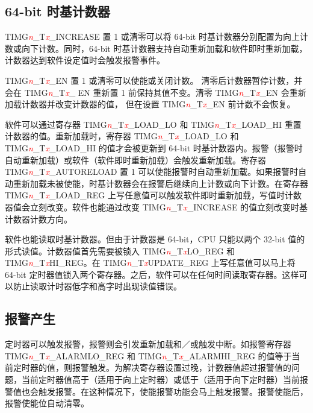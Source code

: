 \documentclass[main\_\_CN.tex]{subfiles}
\begin{document}
\subsection{64-bit 时基计数器}
TIMG\textcolor{red}{\it{n}}\_T\textcolor{red}{\it{x}}\_INCREASE 置 1 或清零可以将 64-bit 时基计数器分别配置为向上计数或向下计数。同时，64-bit 时基计数器支持自动重新加载和软件即时重新加载，计数器达到软件设定值时会触发报警事件。

TIMG\textcolor{red}{\it{n}}\_T\textcolor{red}{\it{x}}\_EN 置 1 或清零可以使能或关闭计数。 清零后计数器暂停计数，并会在 TIMG\textcolor{red}{\it{n}}\_T\textcolor{red}{\it{x}}\_
EN 重新置 1 前保持其值不变。清零 TIMG\textcolor{red}{\it{n}}\_T\textcolor{red}{\it{x}}\_EN 会重新加载计数器并改变计数器的值，
但在设置 TIMG\textcolor{red}{\it{n}}\_T\textcolor{red}{\it{x}}\_EN 前计数不会恢复。

软件可以通过寄存器 TIMG\textcolor{red}{\it{n}}\_T\textcolor{red}{\it{x}}\_LOAD\_LO 和 TIMG\textcolor{red}{\it{n}}\_T\textcolor{red}{\it{x}}\_LOAD\_HI 重置计数器的值。重新加载时，寄存器 TIMG\textcolor{red}{\it{n}}\_T\textcolor{red}{\it{x}}\_LOAD\_LO 和 TIMG\textcolor{red}{\it{n}}\_T\textcolor{red}{\it{x}}\_LOAD\_HI 的值才会被更新到 64-bit 时基计数器内。报警（报警时自动重新加载）或软件（软件即时重新加载）会触发重新加载。寄存器 TIMG\textcolor{red}{\it{n}}\_T\textcolor{red}{\it{x}}\_AUTORELOAD 置 1 可以使能报警时自动重新加载。如果报警时自动重新加载未被使能，时基计数器会在报警后继续向上计数或向下计数。在寄存器 TIMG\textcolor{red}{\it{n}}\_T\textcolor{red}{\it{x}}\_LOAD\_REG 上写任意值可以触发软件即时重新加载，写值时计数器值会立刻改变。软件也能通过改变 TIMG\textcolor{red}{\it{n}}\_T\textcolor{red}{\it{x}}\_INCREASE 的值立刻改变时基计数器计数方向。

软件也能读取时基计数器。但由于计数器是 64-bit，CPU 只能以两个 32-bit 值的形式读值。计数器值首先需要被锁入 TIMG\textcolor{red}{\it{n}}\_T\textcolor{red}{\it{x}}LO\_REG 和 TIMG\textcolor{red}{\it{n}}\_T\textcolor{red}{\it{x}}HI\_REG。在 TIMG\textcolor{red}{\it{n}}\_T\textcolor{red}{\it{x}}UPDATE\_REG 上写任意值可以马上将 64-bit 定时器值锁入两个寄存器。之后，软件可以在任何时间读取寄存器。这样可以防止读取计时器低字和高字时出现读值错误。

\subsection{报警产生}

定时器可以触发报警，报警则会引发重新加载和／或触发中断。如报警寄存器 TIMG\textcolor{red}{\it{n}}\_T\textcolor{red}{\it{x}}\_ALARMLO\_REG 和 TIMG\textcolor{red}{\it{n}}\_T\textcolor{red}{\it{x}}\_ALARMHI\_REG 的值等于当前定时器的值，则报警触发。为解决寄存器设置过晚，计数器值超过报警值的问题，当前定时器值高于（适用于向上定时器）或低于（适用于向下定时器）当前报警值也会触发报警。在这种情况下，使能报警功能会马上触发报警。报警使能后，报警使能位自动清零。
\end{document}
